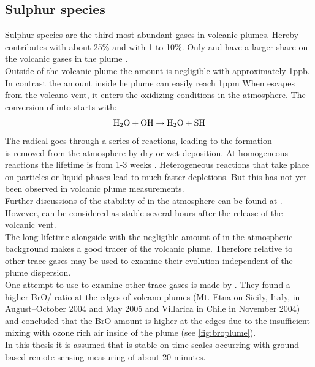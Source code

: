 \documentclass  [
  paper    = a4,
  BCOR     = 10mm,
  twoside,
  fontsize = 12pt,
  fleqn,
  toc      = bibnumbered,
  toc      = listofnumbered,
  numbers  = noendperiod,
  headings = normal,
  listof   = leveldown,
  version  = 3.03
]                                       {scrreprt}
\begin{document}
\subsection{Sulphur species\label{chap:so2}}
Sulphur species are the third most abundant gases in volcanic plumes. Hereby  contributes with about 25\% and  with 1 to 10\%. Only  and  have a larger share on the volcanic gases in the plume .\\
Outside of the volcanic plume the   amount is negligible with approximately 1ppb. In contrast the   amount inside he plume can easily reach 1ppm \cite{Coppenheimer 2003}
When  escapes from the volcano vent, it enters the oxidizing conditions in the atmosphere. The conversion of  into  starts with:
\begin{equation*}
\ce{H2O}+\ce{OH}\rightarrow \ce{H2O}+\ce{SH}
\end{equation*}
The  radical goes through a series of reactions, leading to the  formation \cite{Seinfeld}\\
 is removed from the atmosphere by dry or wet
deposition. At homogeneous reactions the lifetime is from 1-3 weeks \cite{robock2000volcanic}. Heterogeneous reactions that take place on particles or liquid phases lead to much faster depletions. But this has not yet been observed in volcanic plume measurements.\\
Further discussions of the stability of   in the atmosphere can be found at \cite{lubcke2014optical}.\\
However,  can be considered as stable several hours after the release of the volcanic vent.\\ The long lifetime  alongside with the negligible amount of  in the atmospheric background makes  a good tracer of the volcanic plume.
Therefore relative to other trace gases  may be used to examine their evolution independent of the plume dispersion.\\
One attempt to use  to examine other trace gases is made by \cite{bobrowski2007reactive}. They found a higher BrO/ ratio at the edges of volcano plumes (Mt. Etna on Sicily, Italy, in August–October 2004 and May 2005 and Villarica in Chile in November 2004) and concluded that the BrO amount is higher at the edges due to the insufficient mixing with ozone rich air inside of the plume (see \ref{fig:broplume}).\\
In this thesis it is assumed that   is stable on time-scales occurring with ground based remote sensing measuring of about 20 minutes. \\
\end{document}
